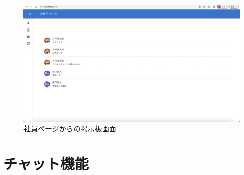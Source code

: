       \begin{figure}[!h]
        \begin{center}
          \includegraphics[scale=0.3, clip]{./img/sample19.png}
          \caption{社員ページからの掲示板画面}
          \label{fig:図の名前}
        \end{center}
        \end{figure}

\clearpage

\section{チャット機能}
